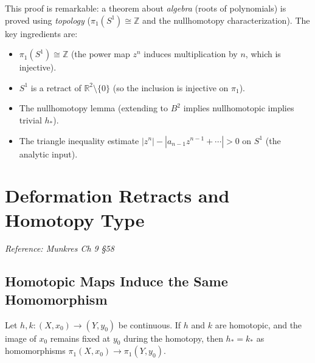 \documentclass[11pt]{report}
\begin{document}
\begin{rembox}
This proof is remarkable: a theorem about \emph{algebra} (roots of polynomials) is proved using \emph{topology} ($\pi_1(S^1) \cong \mathbb{Z}$ and the nullhomotopy characterization). The key ingredients are:
\begin{itemize}[nosep]
    \item $\pi_1(S^1) \cong \mathbb{Z}$ (the power map $z^n$ induces multiplication by $n$, which is injective).
    \item $S^1$ is a retract of $\mathbb{R}^2 \setminus \{0\}$ (so the inclusion is injective on $\pi_1$).
    \item The nullhomotopy lemma (extending to $B^2$ implies nullhomotopic implies trivial $h_*$).
    \item The triangle inequality estimate $|z^n| - |a_{n-1}z^{n-1} + \cdots| > 0$ on $S^1$ (the analytic input).
\end{itemize}
\end{rembox}

\section{Deformation Retracts and Homotopy Type}

\textit{Reference: Munkres Ch 9 \S 58}

\subsection{Homotopic Maps Induce the Same Homomorphism}\label{sec:hom-maps-induce}

\begin{lembox}
Let $h, k: (X, x_0) \to (Y, y_0)$ be continuous. If $h$ and $k$ are homotopic, and the image of $x_0$ remains fixed at $y_0$ during the homotopy, then $h_* = k_*$ as homomorphisms $\pi_1(X, x_0) \to \pi_1(Y, y_0)$.
\end{lembox}
\end{document}

